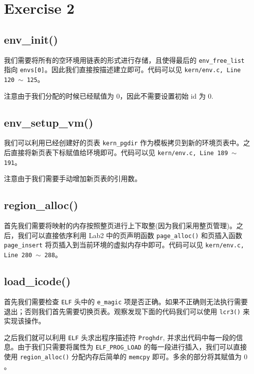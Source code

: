 \documentclass[11pt]{article}
\begin{document}
	\section{Exercise 2}
	
	\subsection*{env\_init()}
	
		我们需要将所有的空环境用链表的形式进行存储，且使得最后的 \texttt{env\_free\_list} 指向 \texttt{envs[0]}。因此我们直接按描述建立即可。代码可以见 \texttt{kern/env.c, Line 120 $\sim$ 125}。
		
		注意由于我们分配的时候已经赋值为 0，因此不需要设置初始 id 为 0.
		
	
	\subsection*{env\_setup\_vm()}
	
		我们可以利用已经创建好的页表 \texttt{kern\_pgdir} 作为模板拷贝到新的环境页表中。之后直接将新页表下标赋值给环境即可。代码可以见  \texttt{kern/env.c, Line 189 $\sim$ 191}。
		
		注意由于我们需要手动增加新页表的引用数。
	
	\subsection*{region\_alloc()}
	
		首先我们需要将映射的内存按照整页进行上下取整(因为我们采用整页管理)。之后，我们可以直接依序利用 Lab2 中的页声明函数 \texttt{page\_alloc()} 和页插入函数 \texttt{page\_insert} 将页插入到当前环境的虚拟内存中即可。代码可以见  \texttt{kern/env.c, Line 280 $\sim$ 288}。
		
		
	\subsection*{load\_icode()}
	
		首先我们需要检查 \texttt{ELF} 头中的 \texttt{e\_magic} 项是否正确。如果不正确则无法执行需要退出；否则我们首先需要切换页表。观察发现下面的代码我们可以使用 \texttt{lcr3()} 来实现该操作。
		
		之后我们就可以利用 \texttt{ELF} 头求出程序描述符 \texttt{Proghdr}, 并求出代码中每一段的信息。由于我们只需要将属性为 \texttt{ELF\_PROG\_LOAD} 的每一段进行插入，我们可以直接使用 \texttt{region\_alloc()} 分配内存后简单的 \texttt{memcpy} 即可。多余的部分将其赋值为 $0$。
		
\end{document}
